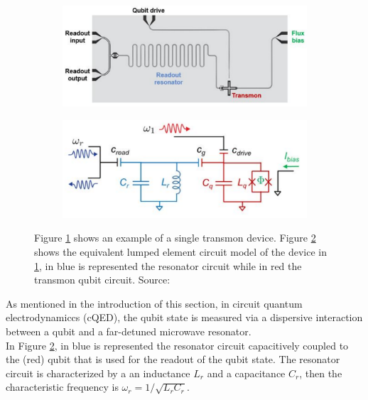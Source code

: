 \begin{figure}[h!]
    \centering
    \begin{subfigure}{0.47\textwidth}
        \centering
        \includegraphics[width=\textwidth]{figures/png/TransmonBoard.png}
        \subcaption{}
        \label{fig:TransmonBoard}
    \end{subfigure}
    \hfill
    \begin{subfigure}{0.47\textwidth}
        \centering
        \includegraphics[width=\textwidth]{figures/png/TransmonCircuit.png}
        \subcaption{}
        \label{fig:TransmonCircuit}
    \end{subfigure}
    \caption{Figure \ref{fig:TransmonBoard} shows an example of a single transmon device. Figure \ref{fig:TransmonCircuit} shows the equivalent lumped element circuit model of the device in \ref{fig:TransmonBoard}, in blue is represented the resonator circuit while in red the transmon qubit circuit. Source: \cite{Roth_2023}}
    \label{fig:Transmon_model}
\end{figure}

As mentioned in the introduction of this section, in circuit quantum electrodynamiccs (cQED), the qubit state is measured via a dispersive interaction between a qubit and a far-detuned microwave resonator.\\

In Figure \ref{fig:TransmonCircuit}, in blue is represented the resonator circuit capacitively coupled to the (red) qubit that is used for the readout of the qubit state. 
The resonator circuit is characterized by a an inductance $L_r$ and a capacitance $C_r$, then the characteristic frequency is $\omega_r =  1/\sqrt{L_r C_r}$. 

